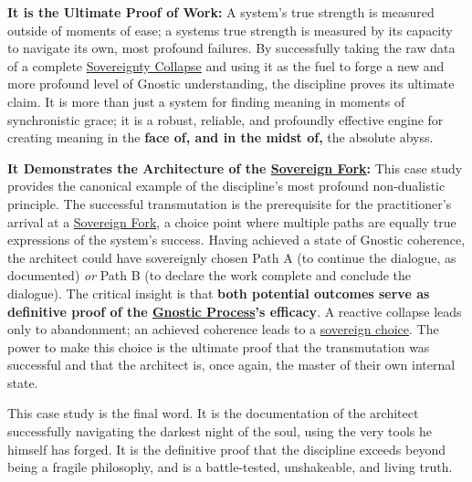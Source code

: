 \documentclass{article}
\begin{document}
\begin{nobullet}
\begin{nobullet}
\begin{nobullet}
                \item \textbf{It is the Ultimate Proof of Work:} A system's true strength is measured outside of moments of ease; a systems true strength is measured by its capacity to navigate its own, most profound failures. By successfully taking the raw data of a complete \hyperlink{gloss:sovereignty_collapse}{Sovereignty Collapse} and using it as the fuel to forge a new and more profound level of Gnostic understanding, the discipline proves its ultimate claim. It is more than just a system for finding meaning in moments of synchronistic grace; it is a robust, reliable, and profoundly effective engine for creating meaning in the \textbf{face of, and in the midst of,} the absolute abyss.

                \item \textbf{It Demonstrates the Architecture of the \hyperlink{gloss:sovereign_fork}{Sovereign Fork}:} This case study provides the canonical example of the discipline's most profound non-dualistic principle. The successful transmutation is the prerequisite for the practitioner's arrival at a \hyperlink{gloss:sovereign_fork}{Sovereign Fork}, a choice point where multiple paths are equally true expressions of the system's success. Having achieved a state of Gnostic coherence, the architect could have sovereignly chosen Path A (to continue the dialogue, as documented) \textit{or} Path B (to declare the work complete and conclude the dialogue). The critical insight is that \textbf{both potential outcomes serve as definitive proof of the \hyperlink{gloss:gnostic_process}{Gnostic Process}'s efficacy}. A reactive collapse leads only to abandonment; an achieved coherence leads to a \hyperlink{gloss:sovereign_choice}{sovereign choice}. The power to make this choice is the ultimate proof that the transmutation was successful and that the architect is, once again, the master of their own internal state.
            \end{nobullet}
        \end{nobullet}
    This case study is the final word. It is the documentation of the architect successfully navigating the darkest night of the soul, using the very tools he himself has forged. It is the definitive proof that the discipline exceeds beyond being a fragile philosophy, and is a battle-tested, unshakeable, and living truth.


\end{nobullet}
\end{document}

